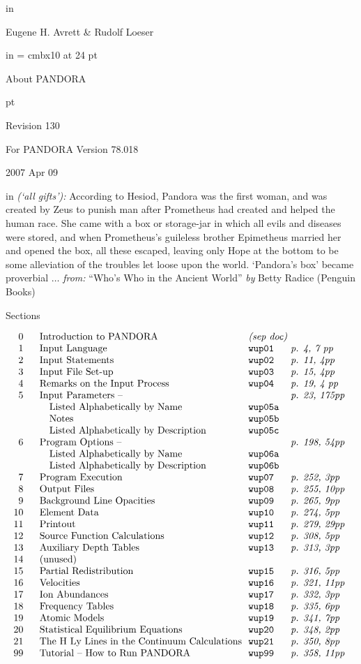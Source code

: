
\nopagenumbers

\top
{} in
\centerline{Eugene H. Avrett \& Rudolf Loeser}
 in
% 
\font\bigfont = cmbx10 at 24 pt
{ \bigfont \centerline{About PANDORA} } 
% 
\vfill \vfill \vfill \vfill \vfill
\vfill \vfill \vfill \vfill \vfill
\vfill \vfill \vfill \vfill \vfill
\vfill \vfill \vfill \vfill \vfill
{} pt
\centerline{Revision 130}
\centerline{For PANDORA Version 78.018}
\centerline{2007 Apr 09}
\ej

\top
{} in
\vfill \vfill
\vfill \vfill
{} {\it (`all gifts'):}
According to Hesiod,
Pandora was the first woman, and was created by Zeus to punish man after
Prometheus had created and helped the human race. She came with a box
or storage-jar in which all evils and diseases were stored, and when
Prometheus's guileless brother Epimetheus married her and opened the box,
all these escaped, leaving only Hope at the bottom to be some alleviation
of the troubles let loose upon the world. `Pandora's box' became
proverbial $\ldots$
\blankline
\blankline
\vbox{\hfill {\it from:}
``Who's Who in the Ancient World''}
\vbox{\hfill {\it by} Betty Radice (Penguin Books)}
\ej

\top
\centerline{Sections}
\blankline
$$\vbox{\halign{
\hfill # & \quad # \hfill & \tt # \hfill & \it p. #pp \hfill \cr
0 & Introduction to PANDORA & %
                             \it(sep doc)\cr
1 & Input Language               & wup01 &  4, 7 \cr
2 & Input Statements             & wup02 & 11, 4\cr
3 & Input File Set-up            & wup03 & 15, 4\cr
4 & Remarks on the Input Process & wup04 & 19, 4 \cr
5 & Input Parameters --          &       & 23, 175\cr
\phantom{.} & \quad Listed Alphabetically by Name & wup05a \cr
\phantom{.} & \quad Notes & wup05b \cr
\phantom{.} & \quad Listed Alphabetically by Description \qquad & wup05c \cr
6 & Program Options --                            &        & 198, 54\cr
\phantom{.} & \quad Listed Alphabetically by Name & wup06a \cr
\phantom{.} & \quad Listed Alphabetically by Description & wup06b \cr
7 & Program Execution                             & wup07 & 252, 3\cr
8 & Output Files                                  & wup08 & 255, 10\cr
9 & Background Line Opacities                     & wup09 & 265, 9\cr
10 & Element Data                                 & wup10 & 274, 5\cr
11 & Printout                                     & wup11 & 279, 29\cr
12 & Source Function Calculations                 & wup12 & 308, 5\cr
13 & Auxiliary Depth Tables                       & wup13 & 313, 3\cr
14 & (unused) \cr
15 & Partial Redistribution                       & wup15 & 316, 5\cr
16 & Velocities                                   & wup16 & 321, 11\cr
17 & Ion Abundances                               & wup17 & 332, 3\cr
18 & Frequency Tables                             & wup18 & 335, 6\cr
19 & Atomic Models                                & wup19 & 341, 7\cr
20 & Statistical Equilibrium Equations            & wup20 & 348, 2\cr
21 & The H Ly Lines in the Continuum Calculations & wup21 & 350, 8\cr
99 & Tutorial -- How to Run PANDORA               & wup99 & 358, 11\cr
}}$$
\vfill 

